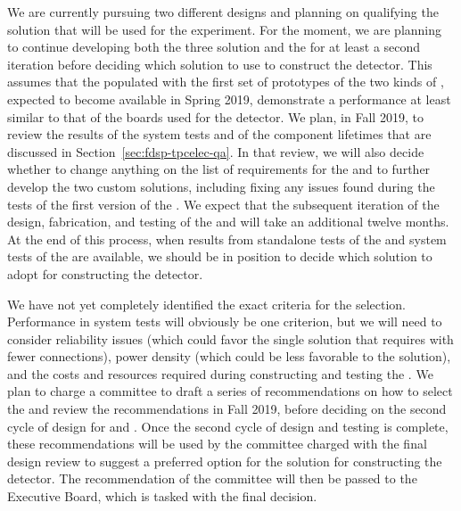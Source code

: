 We are currently pursuing two different  designs and 
planning on qualifying the   solution that 
will be used for the  experiment. For the moment, we 
are planning to continue developing both the three  
solution and the   for at least a second 
iteration before deciding which  solution to use to 
construct the   detector. This assumes that 
the  populated with the first set of prototypes of 
the two kinds of , expected to become available in 
Spring 2019, demonstrate a performance at least similar to that 
of the boards used for the  detector. We plan, in Fall 
2019, to review the results of the system tests and of the
component lifetimes that are discussed in Section~\ref{sec:fdsp-tpcelec-qa}. 
In that review, we will also decide whether to change anything on 
the list of requirements for the  and to further develop
the two custom  solutions, including fixing any 
issues found during the tests of the first version of the 
. We expect that the subsequent iteration
of the design, fabrication, and testing of the  and
 will take an additional twelve months. At the end 
of this process, when results from standalone tests of the
 and system tests of the  are
available, we should be in position to decide which 
solution to adopt for constructing the   detector.

We have not yet completely identified the exact criteria for the 
 selection. Performance in system tests will obviously
be one criterion, but we will need to consider reliability 
issues (which could favor the single  solution 
that requires  with fewer connections), power 
density (which could be less favorable to the  solution),
and the costs and resources required during constructing
and testing the . We plan to charge a committee
to draft a series of recommendations on how to select the
 and review the recommendations in Fall
2019, before deciding on the second cycle of design for
 and . Once the second cycle of design
and testing is complete, these recommendations will be used by the
committee charged with the final design review to suggest a
preferred option for the  solution for constructing 
the   detector. The recommendation of
the committee will then be passed to the  Executive Board,
which is tasked with the final  decision.

